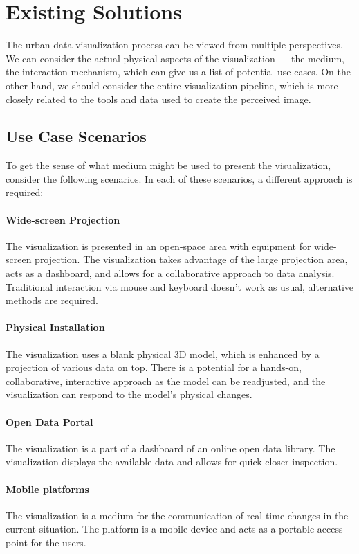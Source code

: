 \section{Existing Solutions}
The urban data visualization process can be viewed from multiple perspectives. We can consider the actual physical aspects of the visualization --- the medium, the interaction mechanism, which can give us a list of potential use cases. On the other hand, we should consider the entire visualization pipeline, which is more closely related to the tools and data used to create the perceived image. 


\subsection{Use Case Scenarios}
To get the sense of what medium might be used to present the visualization, consider the following scenarios. In each of these scenarios, a different approach is required:

\paragraph{Wide-screen Projection} The visualization is presented in an open-space area with equipment for wide-screen projection. The visualization takes advantage of the large projection area, acts as a dashboard, and allows for a collaborative approach to data analysis. Traditional interaction via mouse and keyboard doesn't work as usual, alternative methods are required.
\paragraph{Physical Installation} The visualization uses a blank physical 3D model, which is enhanced by a projection of various data on top. There is a potential for a hands-on, collaborative, interactive approach as the model can be readjusted, and the visualization can respond to the model's physical changes.  
\paragraph{Open Data Portal} The visualization is a part of a dashboard of an online open data library. The visualization displays the available data and allows for quick closer inspection. 
\paragraph{Mobile platforms} The visualization is a medium for the communication of real-time changes in the current situation. The platform is a mobile device and acts as a portable access point for the users.


